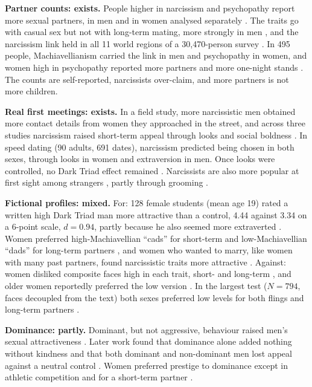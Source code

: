 \documentclass[conference,a4paper]{IEEEtran}
\begin{document}
\textbf{Partner counts: exists.} People higher in narcissism and psychopathy report more sexual partners, in men and in women analysed separately \cite{borrazleon2021}. The traits go with casual sex but not with long-term mating, more strongly in men \cite{jonason2009,lee2013sex}, and the narcissism link held in all 11 world regions of a 30,470-person survey \cite{schmitt2017narc}. In 495 people, Machiavellianism carried the link in men and psychopathy in women, and women high in psychopathy reported more partners and more one-night stands \cite{freyth2023}. The counts are self-reported, narcissists over-claim, and more partners is not more children.

\textbf{Real first meetings: exists.} In a field study, more narcissistic men obtained more contact details from women they approached in the street, and across three studies narcissism raised short-term appeal through looks and social boldness \cite{dufner2013}. In speed dating (90 adults, 691 dates), narcissism predicted being chosen in both sexes, through looks in women and extraversion in men. Once looks were controlled, no Dark Triad effect remained \cite{jauk2016}. Narcissists are also more popular at first sight among strangers \cite{back2010}, partly through grooming \cite{holtzman2010,holtzman2013}.

\textbf{Fictional profiles: mixed.} For: 128 female students (mean age 19) rated a written high Dark Triad man more attractive than a control, 4.44 against 3.34 on a 6-point scale, $d=0.94$, partly because he also seemed more extraverted \cite{carter2014}. Women preferred high-Machiavellian ``cads'' for short-term and low-Machiavellian ``dads'' for long-term partners \cite{aitken2013}, and women who wanted to marry, like women with many past partners, found narcissistic traits more attractive \cite{haslam2015}. Against: women disliked composite faces high in each trait, short- and long-term \cite{brewer2018faces,lyons2016faces}, and older women reportedly preferred the low version \cite{qureshi2016}. In the largest test ($N=794$, faces decoupled from the text) both sexes preferred low levels for both flings and long-term partners \cite{dragostinov2025}.

\textbf{Dominance: partly.} Dominant, but not aggressive, behaviour raised men's sexual attractiveness \cite{sadalla1987}. Later work found that dominance alone added nothing without kindness \cite{jensencampbell1995} and that both dominant and non-dominant men lost appeal against a neutral control \cite{burger1999}. Women preferred prestige to dominance except in athletic competition and for a short-term partner \cite{snyder2008}.
\end{document}
